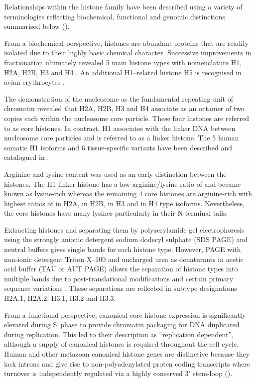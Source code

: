   Relationships within the histone family have been described using a variety of terminologies
  reflecting biochemical, functional and genomic distinctions summarised below ().

  From a biochemical perspective, histones are abundant proteins 
  that are readily isolated due to their highly basic chemical character. 
  Successive improvements in fractionation ultimately revealed 5 main histone types 
  with nomenclature H1, H2A, H2B, H3 and H4 \citep{nomenclature}.
  An additional H1--related histone H5 is recognised in avian erythrocytes \citep{HFive-review}.

  The demonstration of the nucleosome as the fundamental repeating unit of chromatin \citep{Kornberg1974} 
  revealed that H2A, H2B, H3 and H4 associate as an octamer of two copies each within the
  nucleosome core particle. These four histones are referred to as core histones. 
  In contrast, H1 associates with the linker DNA between nucleosome core particles 
  and is referred to as a linker histone. 
  The 5 human somatic H1 isoforms and 6 tissue-specific variants 
  have been described and catalogued in \citep{HarshmanFreitas2013}.

  Arginine and lysine content was used as an early distinction between the histones. 
  The H1 linker histone has a low arginine/lysine ratio of \LinkerArgLysRatio{} and became known as lysine-rich 
  whereas the remaining 4 core histones are arginine-rich 
  with highest ratios of \HTwoAArgLysRatio{} in H2A, \HTwoBArgLysRatio{} in H2B, 
  \HThreeArgLysRatio{} in H3 and \HFourArgLysRatio{} in H4 type isoforms.
  Nevertheless, the core histones have many lysines particularly in their N-terminal tails.

  Extracting histones and separating them by polyacrylamide gel electrophoresis 
  using the strongly anionic detergent sodium dodecyl sulphate (SDS PAGE) and neutral buffers 
  gives single bands for each histone type. 
  However, PAGE with non-ionic detergent Triton X--100 and uncharged urea as denaturants
  in acetic acid buffer (TAU or AUT PAGE) allows the separation of histone types into multiple bands 
  due to post-translational modifications and certain primary sequence variations \citep{PAGEND}. 
  These separations are reflected in subtype designations H2A.1, H2A.2, H3.1, H3.2 and H3.3. 

  From a functional perspective, canonical core histone expression
  is significantly elevated during S~phase to provide chromatin packaging 
  for DNA duplicated during replication.
  This led to their description as ``replication dependent'', 
  although a supply of canonical histones is required throughout the cell cycle. 
  Human and other metazoan canonical histone genes are distinctive 
  because they lack introns and give rise to non-polyadenylated proten coding transcripts 
  where turnover is independently regulated via a highly conserved 3' stem-loop ().

